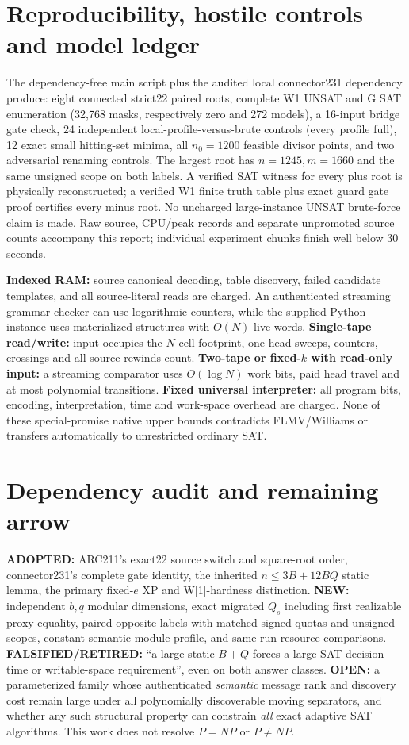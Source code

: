 \documentclass[10pt]{article}
\begin{document}
\section{Reproducibility, hostile controls and model ledger}
\noindent The dependency-free main script plus the audited local connector231 dependency produce: eight connected strict22 paired roots, complete W1 UNSAT and G SAT enumeration (32,768 masks, respectively zero and 272 models), a 16-input bridge gate check, 24 independent local-profile-versus-brute controls (every profile full), 12 exact small hitting-set minima, all $n_0=1200$ feasible divisor points, and two adversarial renaming controls. The largest root has $n=1245,m=1660$ and the same unsigned scope on both labels. A verified SAT witness for every plus root is physically reconstructed; a verified W1 finite truth table plus exact guard gate proof certifies every minus root. No uncharged large-instance UNSAT brute-force claim is made. Raw source, CPU/peak records and separate unpromoted source counts accompany this report; individual experiment chunks finish well below 30 seconds.

\noindent \textbf{Indexed RAM:} source canonical decoding, table discovery, failed candidate templates, and all source-literal reads are charged. An authenticated streaming grammar checker can use logarithmic counters, while the supplied Python instance uses materialized structures with $O(N)$ live words. \textbf{Single-tape read/write:} input occupies the $N$-cell footprint, one-head sweeps, counters, crossings and all source rewinds count. \textbf{Two-tape or fixed-$k$ with read-only input:} a streaming comparator uses $O(\log N)$ work bits, paid head travel and at most polynomial transitions. \textbf{Fixed universal interpreter:} all program bits, encoding, interpretation, time and work-space overhead are charged. None of these special-promise native upper bounds contradicts FLMV/Williams or transfers automatically to unrestricted ordinary SAT.

\section{Dependency audit and remaining arrow}
\noindent \textbf{ADOPTED:} ARC211's exact22 source switch and square-root order, connector231's complete gate identity, the inherited $n\le3B+12BQ$ static lemma, the primary fixed-$e$ XP and W[1]-hardness distinction. \textbf{NEW:} independent $b,q$ modular dimensions, exact migrated $Q_s$ including first realizable proxy equality, paired opposite labels with matched signed quotas and unsigned scopes, constant semantic module profile, and same-run resource comparisons. \textbf{FALSIFIED/RETIRED:} ``a large static $B+Q$ forces a large SAT decision-time or writable-space requirement'', even on both answer classes. \textbf{OPEN:} a parameterized family whose authenticated \emph{semantic} message rank and discovery cost remain large under all polynomially discoverable moving separators, and whether any such structural property can constrain \emph{all} exact adaptive SAT algorithms. This work does not resolve $P=NP$ or $P\ne NP$.
\end{document}
